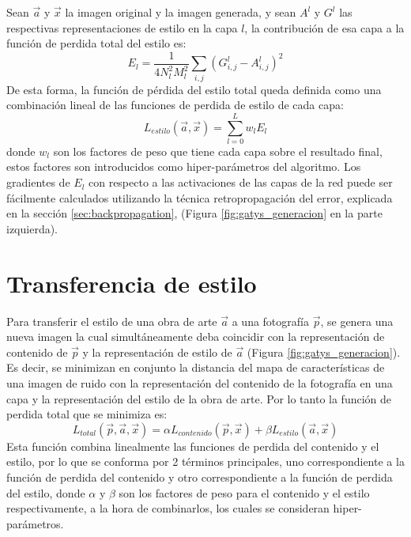 \documentclass[a4paper,11pt,spanish]{book}
\begin{document}
      Sean $\overrightarrow{a}$ y $\overrightarrow{x}$ la imagen original y la imagen generada, y sean $A^l$ y $G^l$
      las respectivas representaciones de estilo en la capa $l$, la contribución de esa capa a la función de perdida total del estilo es:
      \begin{equation}
       E_l = \frac{1}{4 N_l^2 M_l^2} \sum_{i,j} (G_{i,j}^l - A_{i,j}^l)^2
      \end{equation}
      De esta forma, la función de pérdida del estilo total queda definida como una combinación lineal de las funciones de perdida de estilo de cada capa:
      \begin{equation}
       L_{estilo}(\overrightarrow{a},\overrightarrow{x}) = \sum_{l=0}^{L} w_l E_l
      \end{equation}
      donde $w_l$ son los factores de peso que tiene cada capa sobre el resultado final, estos factores son introducidos como hiper-parámetros del algoritmo. 
      Los gradientes de $E_l$ con respecto a las activaciones de las capas de la red puede ser fácilmente
      calculados utilizando la técnica retropropagación del error, explicada en la sección \ref{sec:backpropagation}, (Figura \ref{fig:gatys_generacion} en la parte izquierda).
      
    \section{Transferencia de estilo}
      Para transferir el estilo de una obra de arte $\overrightarrow{a}$ a una fotografía $\overrightarrow{p}$, se genera una nueva imagen
      la cual simultáneamente deba coincidir con la representación de contenido de $\overrightarrow{p}$ y la representación de estilo de $\overrightarrow{a}$ (Figura \ref{fig:gatys_generacion}). 
      Es decir, se minimizan en conjunto la distancia del mapa de características de una imagen de ruido con la representación del contenido de la fotografía
      en una capa y la representación del estilo de la obra de arte. Por lo tanto la función de perdida total que se minimiza es:
      \begin{equation}\label{eq:objetivo}
       L_{total}(\overrightarrow{p},\overrightarrow{a},\overrightarrow{x}) = \alpha L_{contenido}(\overrightarrow{p},\overrightarrow{x}) + \beta L_{estilo}(\overrightarrow{a},\overrightarrow{x})
      \end{equation}
      Esta función combina linealmente las funciones de perdida del contenido y el estilo, por lo que se conforma por 2 términos principales, uno correspondiente a la función de perdida
      del contenido y otro correspondiente a la función de perdida del estilo, donde $\alpha$ y $\beta$ son los factores de peso para el contenido y el estilo respectivamente,
      a la hora de combinarlos, los cuales se consideran hiper-parámetros. 
      
\end{document}
